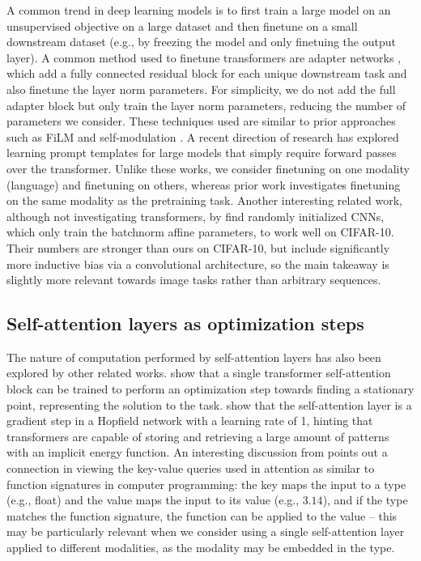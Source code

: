 A common trend in deep learning models is to first train a large model on an unsupervised objective on a large dataset \citep{dai2015semi, radford2018gpt} and then finetune on a small downstream dataset (e.g., by freezing the model and only finetuing the output layer).
A common method used to finetune transformers are adapter networks \citep{rebuffi2017adapter, houlsby2019adapter}, which add a fully connected residual block for each unique downstream task and also finetune the layer norm parameters.
For simplicity, we do not add the full adapter block but only train the layer norm parameters, reducing the number of parameters we consider.
These techniques used are similar to prior approaches such as FiLM \citep{perez2018film} and self-modulation \citep{chen2018selfmodulation}.
A recent direction of research has explored learning prompt templates for large models \citep{shin2020autoprompt} that simply require forward passes over the transformer.
Unlike these works, we consider finetuning on one modality (language) and finetuning on others, whereas prior work investigates finetuning on the same modality as the pretraining task.
Another interesting related work, although not investigating transformers, by \cite{frankle2020batchnorm} find randomly initialized CNNs, which only train the batchnorm affine parameters, to work well on CIFAR-10.
Their numbers are stronger than ours on CIFAR-10, but include significantly more inductive bias via a convolutional architecture, so the main takeaway is slightly more relevant towards image tasks rather than arbitrary sequences.

\subsection{Self-attention layers as optimization steps}

The nature of computation performed by self-attention layers has also been explored by other related works.
\cite{bai2019deq} show that a single transformer self-attention block can be trained to perform an optimization step towards finding a stationary point, representing the solution to the task.
\cite{ramsauer2020hopfield} show that the self-attention layer is a gradient step in a Hopfield network with a learning rate of 1, hinting that transformers are capable of storing and retrieving a large amount of patterns with an implicit energy function.
An interesting discussion from \cite{goyal2020inductive} points out a connection in viewing the key-value queries used in attention as similar to function signatures in computer programming: the key maps the input to a type (e.g., float) and the value maps the input to its value (e.g., $3.14$), and if the type matches the function signature, the function can be applied to the value -- this may be particularly relevant when we consider using a single self-attention layer applied to different modalities, as the modality may be embedded in the type.

